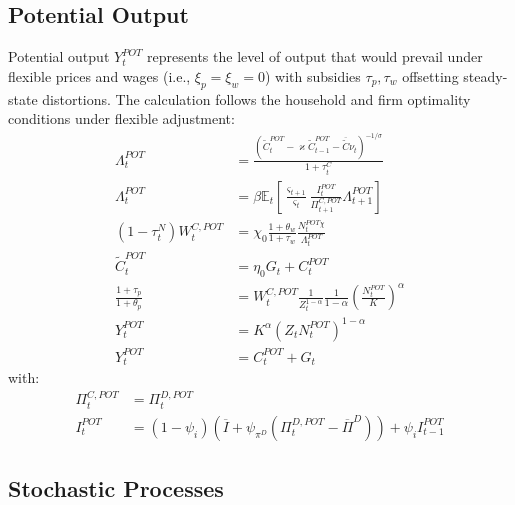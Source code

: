 \documentclass[12pt]{article}
\begin{document}
\subsection{Potential Output}\label{sec:potential}

Potential output $Y_t^{POT}$ represents the level of output that would prevail under flexible prices and wages (i.e., $\xi_p = \xi_w = 0$) with subsidies $\tau_p, \tau_w$ offsetting steady-state distortions. The calculation follows the household and firm optimality conditions under flexible adjustment:
\begin{align}
\Lambda_t^{POT} &= \frac{(\tilde{C}_t^{POT} - \varkappa \tilde{C}_{t-1}^{POT} - \overline{\tilde{C}} \nu_t)^{-1/\sigma}}{1 + \tau_t^C} \\
\Lambda_t^{POT} &= \beta \mathbb{E}_t \left[ \frac{\varsigma_{t+1}}{\varsigma_t} \frac{I_t^{POT}}{\Pi_{t+1}^{C,POT}} \Lambda_{t+1}^{POT} \right] \\
(1-\tau_t^N) W_t^{C,POT} &= \chi_0 \frac{1+\theta_w}{1+\tau_w} \frac{N_t^{POT}{}^{\chi}}{\Lambda_t^{POT}} \\
\tilde{C}_t^{POT} &= \eta_0 G_t + C_t^{POT} \\
\frac{1+\tau_p}{1+\theta_p} &= W_t^{C,POT} \frac{1}{Z_t^{1-\alpha}} \frac{1}{1-\alpha} \left(\frac{N_t^{POT}}{K}\right)^\alpha \\
Y_t^{POT} &= K^\alpha (Z_t N_t^{POT})^{1-\alpha} \\
Y_t^{POT} &= C_t^{POT} + G_t
\end{align}
with:
\begin{align}
\Pi_t^{C,POT} &= \Pi_t^{D,POT} \\
I_t^{POT} &= (1-\psi_i) (\overline{I} + \psi_{\pi^D} (\Pi_t^{D,POT} - \overline{\Pi}^D)) + \psi_i I_{t-1}^{POT}
\end{align}

\subsection{Stochastic Processes}
\end{document}

